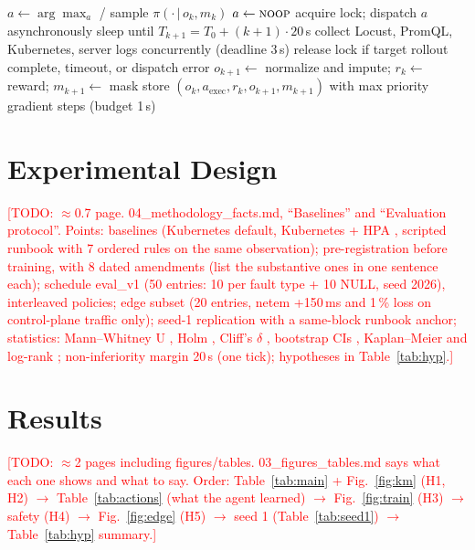 \documentclass[conference,10pt]{IEEEtran}
\newcommand{\todo}[1]{\textcolor{red}{[TODO: #1]}}
\begin{document}
\begin{algorithm}[t]
\caption{One tick of the guarded control loop (20\,s)}\label{alg:loop}
\small
\begin{algorithmic}[1]
\State $a \gets \arg\max_a$ / sample $\pi(\cdot\,|\,o_k, m_k)$ 
 \State $a\gets\textsc{noop}$ \EndIf
{} \State acquire lock; dispatch $a$ asynchronously \EndIf
\State sleep until $T_{k+1}=T_0+(k+1)\cdot 20$\,s
\State collect Locust, PromQL, Kubernetes, server logs concurrently (deadline 3\,s)
\State release lock if target rollout complete, timeout, or dispatch error
\State $o_{k+1}\gets$ normalize and impute; $r_k\gets$ reward; $m_{k+1}\gets$ mask
 \State store $(o_k,a_{\mathrm{exec}},r_k,o_{k+1},m_{k+1})$ with max priority \EndIf
{} gradient steps (budget 1\,s)
\end{algorithmic}
\end{algorithm}

\section{Experimental Design}\label{sec:design}
\todo{$\approx$0.7 page. 04\_methodology\_facts.md, ``Baselines'' and ``Evaluation protocol''. Points:
baselines (Kubernetes default, Kubernetes + HPA \cite{k8shpa}, scripted runbook with 7 ordered rules on the same observation); pre-registration before training, with 8 dated amendments (list the substantive ones in one sentence each); schedule eval\_v1 (50 entries: 10 per fault type + 10 NULL, seed 2026), interleaved policies; edge subset (20 entries, netem \cite{hemminger2005netem} +150\,ms and 1\,\% loss on control-plane traffic only); seed-1 replication with a same-block runbook anchor; statistics: Mann--Whitney U \cite{mann1947test}, Holm \cite{holm1979simple}, Cliff's $\delta$ \cite{cliff1993dominance}, bootstrap CIs \cite{efron1993bootstrap}, Kaplan--Meier and log-rank \cite{kaplan1958nonparametric}; non-inferiority margin 20\,s (one tick); hypotheses in Table~\ref{tab:hyp}.}

\section{Results}\label{sec:results}
\todo{$\approx$2 pages including figures/tables. 03\_figures\_tables.md says what each one shows and what to say. Order: Table~\ref{tab:main} + Fig.~\ref{fig:km} (H1, H2) $\rightarrow$ Table~\ref{tab:actions} (what the agent learned) $\rightarrow$ Fig.~\ref{fig:train} (H3) $\rightarrow$ safety (H4) $\rightarrow$ Fig.~\ref{fig:edge} (H5) $\rightarrow$ seed 1 (Table~\ref{tab:seed1}) $\rightarrow$ Table~\ref{tab:hyp} summary.}
\end{document}
